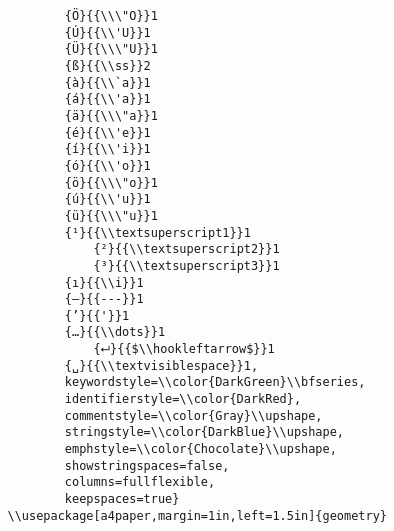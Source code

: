 \documentclass[11pt]{article}
\begin{document}
\begin{verbatim}
                        {Ö}{{\\\"O}}1
                        {Ú}{{\\'U}}1
                        {Ü}{{\\\"U}}1
                        {ß}{{\\ss}}2
                        {à}{{\\`a}}1
                        {á}{{\\'a}}1
                        {ä}{{\\\"a}}1
                        {é}{{\\'e}}1
                        {í}{{\\'i}}1
                        {ó}{{\\'o}}1
                        {ö}{{\\\"o}}1
                        {ú}{{\\'u}}1
                        {ü}{{\\\"u}}1
                        {¹}{{\\textsuperscript1}}1
                            {²}{{\\textsuperscript2}}1
                            {³}{{\\textsuperscript3}}1
                        {ı}{{\\i}}1
                        {—}{{---}}1
                        {’}{{'}}1
                        {…}{{\\dots}}1
                            {⮠}{{$\\hookleftarrow$}}1
                        {␣}{{\\textvisiblespace}}1,
                        keywordstyle=\\color{DarkGreen}\\bfseries,
                        identifierstyle=\\color{DarkRed},
                        commentstyle=\\color{Gray}\\upshape,
                        stringstyle=\\color{DarkBlue}\\upshape,
                        emphstyle=\\color{Chocolate}\\upshape,
                        showstringspaces=false,
                        columns=fullflexible,
                        keepspaces=true}
                \\usepackage[a4paper,margin=1in,left=1.5in]{geometry}

\end{verbatim}
\end{document}
